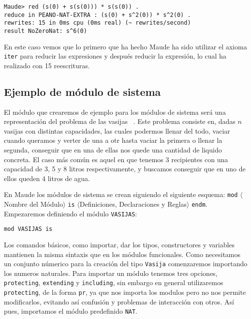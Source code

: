 {\codesize
\begin{verbatim}
Maude> red (s(0) + s(s(0))) * s(s(0)) .
reduce in PEANO-NAT-EXTRA : (s(0) + s^2(0)) * s^2(0) .
rewrites: 15 in 0ms cpu (0ms real) (~ rewrites/second)
result NoZeroNat: s^6(0)
\end{verbatim}
}

\noindent En este caso vemos que lo primero que ha hecho Maude ha sido utilizar el axioma \texttt{iter} para reducir las expresiones y después reducir la expresión, lo cual ha realizado con 15 reescrituras.

\subsection{Ejemplo de módulo de sistema}

El módulo que crearemos de ejemplo para los módulos de sistema será una representación del problema de las vasijas ~\cite{maudeBook}. Este problema consiste en, dadas $n$ vasijas con distintas capacidades, las cuales podermos llenar del todo, vaciar cuando queramos y verter de una a otr hasta vaciar la primera o llenar la segunda, conseguir que en una de ellas nos quede una cantidad de liquido concreta. El caso más común es aquel en que tenemos $3$ recipientes con una capacidad de 3, 5 y 8 litros respectivamente, y buscamos conseguir que en uno de ellos queden 4 litros de agua. \par

En Maude los módulos de sistema se crean siguiendo el siguiente esquema: \texttt{mod} $\langle$Nombre del Módulo$\rangle$ \texttt{is} $\langle$Definiciones, Declaraciones y Reglas$\rangle$ \texttt{endm}. Empezaremos definiendo el módulo \texttt{VASIJAS}: \par

{\codesize
\begin{verbatim}
mod VASIJAS is
\end{verbatim}
}

Los comandos básicos, como importar, dar los tipos, constructores y variables mantienen la misma sintaxis que en los módulos funcionales. Como necesitamos un conjunto númerico para la creación del tipo \texttt{Vasija} comenzaremos importando los numeros naturales. Para importar un módulo tenemos tres opciones, \texttt{protecting}, \texttt{extending} y \texttt{including}, sin embargo en general utilizaremos \texttt{protecting}, de la forma \texttt{pr}, ya que nos importa los modulos pero no nos permite modificarlos, evitando así confusión y problemas de interacción con otros. Así pues, importamos el módulo predefinido \texttt{NAT}. \par

